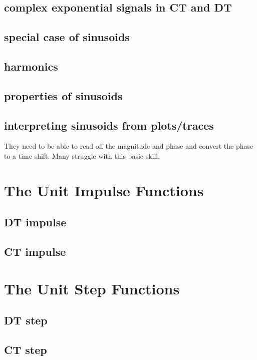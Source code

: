 \documentclass{article}
\begin{document}
\subsection{complex exponential signals in CT and DT}
\label{sec:org9255270}
\subsection{special case of sinusoids}
\label{sec:orgecba192}
\subsection{harmonics}
\label{sec:org5e8d9ab}
\subsection{properties of sinusoids}
\label{sec:orga96306e}
\subsection{interpreting sinusoids from plots/traces}
\label{sec:org53b2fa0}
They need to be able to read off the magnitude and phase and convert the phase to a time shift. Many struggle with this basic skill.

\newpage
\section{The Unit Impulse Functions}
\label{sec:org33257b0}
\subsection{DT impulse}
\label{sec:org1210e0d}
\subsection{CT impulse}
\label{sec:org5a0b8cc}

\newpage
\section{The Unit Step Functions}
\label{sec:orgcd386ae}
\subsection{DT step}
\label{sec:org0ecc466}
\subsection{CT step}
\label{sec:org4d099d0}
\end{document}
